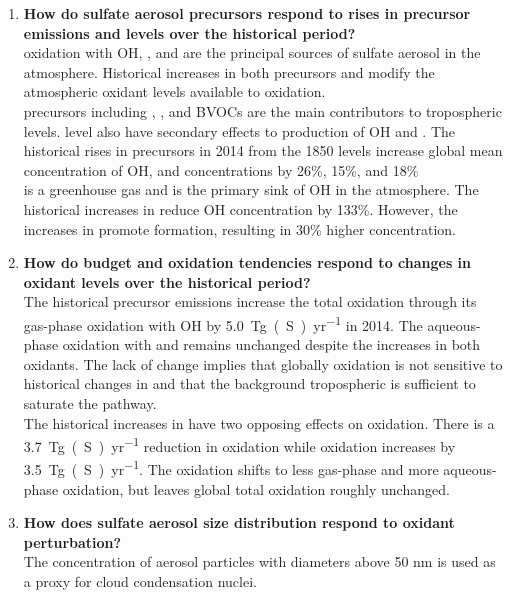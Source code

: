     \begin{enumerate}
        \item  \textbf{How do sulfate aerosol precursors respond to rises in  precursor emissions and  levels over the historical period?}\\
         oxidation with OH, , and  are the principal sources of sulfate aerosol in the atmosphere. Historical increases in both  precursors and  modify the atmospheric oxidant levels available to  oxidation. \\
         precursors including , , and BVOCs are the main contributors to tropospheric  levels.  level also have secondary effects to production of OH and . The historical rises in  precursors in 2014 from the 1850 levels increase global mean concentration of OH,  and  concentrations by 26\%, 15\%, and 18\%  \\
         is a greenhouse gas and is the primary sink of OH in the atmosphere. The historical increases in  reduce OH concentration by 133\%. However, the increases in  promote  formation, resulting in 30\% higher  concentration. 
        \item  \textbf{How do  budget and oxidation tendencies respond to changes in oxidant levels over the historical period?} \\
        The historical  precursor emissions increase the total  oxidation through its gas-phase oxidation with OH by \qty{5.0}{Tg(S)~yr^{-1}} in 2014. The aqueous-phase oxidation with  and  remains unchanged despite the increases in both oxidants. The lack of change implies that globally  oxidation is not sensitive to historical changes in  and that the background tropospheric  is sufficient to saturate the pathway. \\
        The historical increases in  have two opposing effects on  oxidation. There is a \qty{3.7}{Tg(S)~yr^{-1}} reduction in  oxidation while  oxidation increases by \qty{3.5}{Tg(S)~yr^{-1}}. The oxidation shifts to less gas-phase and more aqueous-phase oxidation, but leaves global total oxidation roughly unchanged. 
        \item \textbf{How does sulfate aerosol size distribution respond to oxidant perturbation?} \\
        The concentration of aerosol particles with diameters above 50 nm is used as a proxy for cloud condensation nuclei.\\

\end{enumerate}
